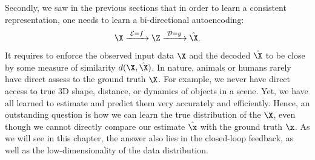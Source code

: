 \documentclass[../../book-main.tex]{subfiles}
\begin{document}
Secondly, we saw in the previous sections that in order to learn a consistent representation, one needs to learn a bi-directional autoencoding:
\begin{equation}
 \X
\xrightarrow{\hspace{1mm} \mathcal{E} = f \hspace{1mm}} \Z  \xrightarrow{\hspace{1mm} \mathcal{D} = g \hspace{1mm}} \hat{\X}.
\end{equation}
It requires to enforce the observed input data $\X$ and the decoded $\hat \X$ to be close by some measure of similarity $d(\X, \hat \X)$. In nature, animals or humans rarely have direct assess to the ground truth $\X$. For example, we never have direct access to true 3D shape, distance, or dynamics of objects in a scene. Yet, we have all learned to estimate and predict them very accurately and efficiently. Hence, an outstanding question is how we can learn the true distribution of the $\X$, even though we cannot directly compare our estimate $\hat \x$ with the ground truth $\x$. As we will see in this chapter, the answer also  lies in the closed-loop feedback, as well as the low-dimensionality of the data distribution. 




\end{document}
